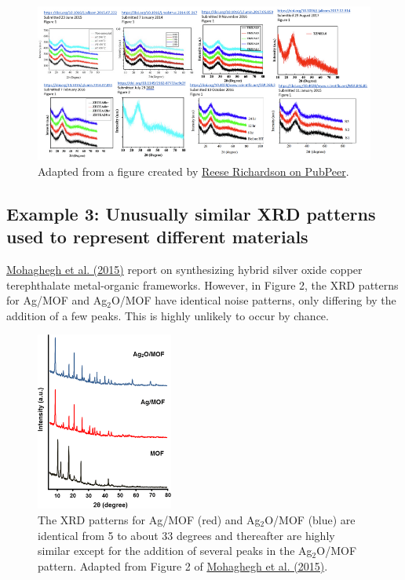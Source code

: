 \documentclass[letterpaper, 12pt]{article}
\begin{document}
\begin{figure}[h!tbp]
    \centering
    \includegraphics[width=\textwidth]{img/xrd_data_duplication/same_xrd_different_articles_small.png}
    \caption*{Adapted from a figure created by \href{https://pubpeer.com/publications/8A1A8F322680DFB05011853190C254\#1}{Reese Richardson on PubPeer}.}
\end{figure}

\pagebreak

\subsection*{Example 3: Unusually similar XRD patterns used to represent different materials}

\href{https://doi.org/10.1007/s10853-015-9003-3}{Mohaghegh et al. (2015)} report on synthesizing hybrid silver oxide copper terephthalate metal-organic frameworks. However, in Figure 2, the XRD patterns for Ag/MOF and Ag$_\text{2}$O/MOF have identical noise patterns, only differing by the addition of a few peaks. This is highly unlikely to occur by chance. 

\begin{figure}[h!tbp]
    \centering
    \includegraphics[width=0.4\textwidth]{img/xrd_data_duplication/mohaghegh_figure_2.png}
    \caption*{The XRD patterns for Ag/MOF (red) and Ag$_\text{2}$O/MOF (blue) are identical from 5 to about 33 degrees and thereafter are highly similar except for the addition of several peaks in the Ag$_\text{2}$O/MOF pattern. Adapted from Figure 2 of \href{https://doi.org/10.1007/s10853-015-9003-3}{Mohaghegh et al. (2015)}.}
\end{figure}
\end{document}
